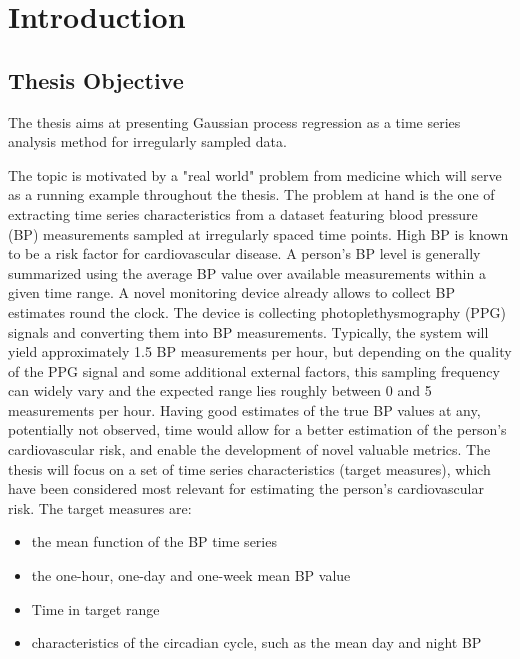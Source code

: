 \chapter{Introduction}\label{ch:introduction}


\section{Thesis Objective}\label{sec:thesis-objective}

The thesis aims at presenting Gaussian process regression as
a time series analysis method for irregularly sampled data.

The topic is motivated by a "real world" problem from medicine which will
serve as a running example throughout the thesis.
%
The problem at hand is the one of extracting time series characteristics from a dataset
featuring blood pressure (BP) measurements sampled at irregularly spaced time points.
High BP is known to be a risk factor for cardiovascular disease.
A person’s BP level is generally summarized using the average BP value over available measurements within a given time range.
A novel monitoring device already allows to collect BP estimates round the clock.
The device is collecting photoplethysmography (PPG) signals and converting them into BP measurements.
Typically, the system will yield approximately 1.5 BP measurements per hour, but depending on the quality of the PPG signal and some additional external factors,
this sampling frequency can widely vary and the expected range lies roughly between 0 and 5 measurements per hour.
Having good estimates of the true BP values at any, potentially not observed, time would allow for a better estimation
of the person’s cardiovascular risk, and enable the development of novel valuable metrics.
The thesis will focus on a set of time series characteristics (target measures),
which have been considered most relevant for estimating the person’s cardiovascular risk.
The target measures are:
\begin{itemize}
    \item the mean function of the BP time series
    \item the one-hour, one-day and one-week mean BP value
    \item Time in target range
    \item characteristics of the circadian cycle, such as the mean day and night BP
\end{itemize}
